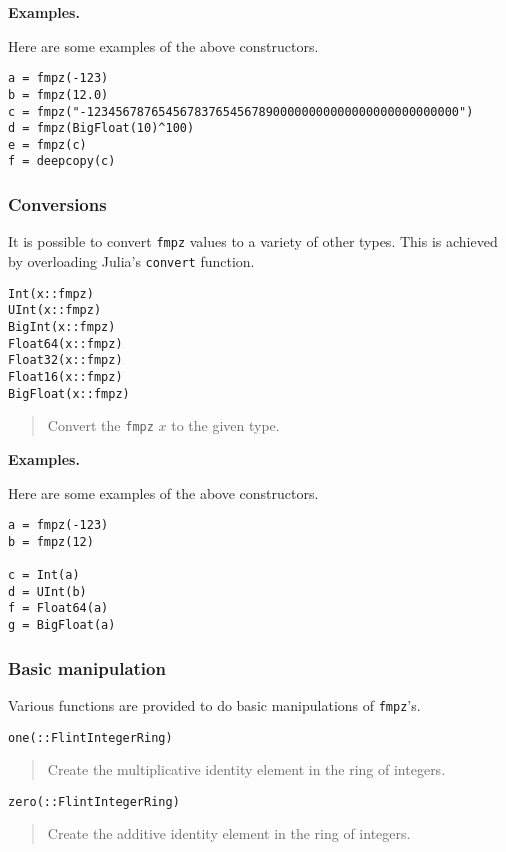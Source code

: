\documentclass[a4paper,10pt]{article}
\newcommand{\code}{\lstinline}
\newcommand{\desc}[1]{\vspace{-3mm}\begin{quote}#1\end{quote}}
\begin{document}
\textbf{Examples.}

Here are some examples of the above constructors.

\begin{lstlisting}
a = fmpz(-123)
b = fmpz(12.0)
c = fmpz("-1234567876545678376545678900000000000000000000000000")
d = fmpz(BigFloat(10)^100)
e = fmpz(c)
f = deepcopy(c)
\end{lstlisting}

\subsubsection{Conversions}

It is possible to convert \code{fmpz} values to a variety of other types. This is
achieved by overloading Julia's \code{convert} function.

\begin{lstlisting}
Int(x::fmpz)
UInt(x::fmpz)
BigInt(x::fmpz)
Float64(x::fmpz)
Float32(x::fmpz)
Float16(x::fmpz)
BigFloat(x::fmpz)
\end{lstlisting}

\desc{Convert the \code{fmpz} $x$ to the given type.}

\textbf{Examples.}

Here are some examples of the above constructors.

\begin{lstlisting}
a = fmpz(-123)
b = fmpz(12)

c = Int(a)
d = UInt(b)
f = Float64(a)
g = BigFloat(a)
\end{lstlisting}

\subsubsection{Basic manipulation}

Various functions are provided to do basic manipulations of \code{fmpz}'s.

\begin{lstlisting}
one(::FlintIntegerRing)
\end{lstlisting}

\desc{Create the multiplicative identity element in the ring of integers.}

\begin{lstlisting}
zero(::FlintIntegerRing)
\end{lstlisting}

\desc{Create the additive identity element in the ring of integers.}
\end{document}
